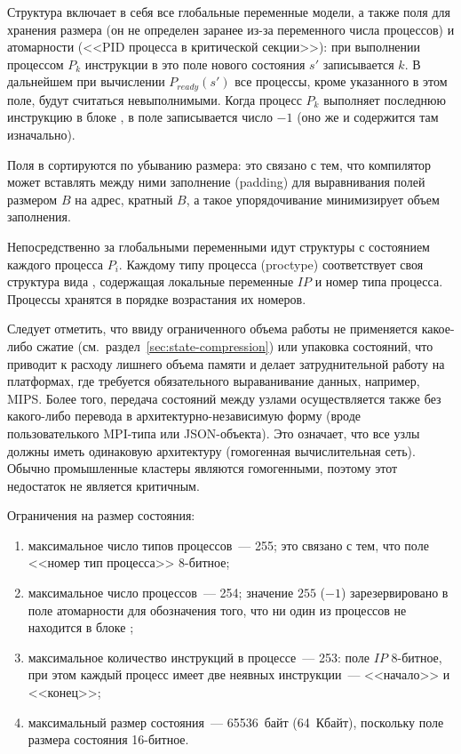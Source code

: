 Структура  включает в себя все глобальные переменные модели, а также поля для
хранения размера (он не определен заранее из-за переменного числа процессов) и атомарности
(<<PID процесса в критической секции>>): при выполнении процессом $P_k$ инструкции
 в это поле нового состояния $s'$ записывается $k$. В дальнейшем при
вычислении $P_{ready}(s')$ все процессы, кроме указанного в этом поле, будут считаться
невыполнимыми. Когда процесс $P_k$ выполняет последнюю инструкцию в блоке , в
поле записывается число $-1$ (оно же и содержится там изначально).

Поля в  сортируются по убыванию размера: это связано с тем, что компилятор
может вставлять между ними заполнение (padding) для выравнивания полей размером $B$ на
адрес, кратный $B$, а такое упорядочивание минимизирует объем заполнения.

Непосредственно за глобальными переменными идут структуры с состоянием каждого процесса
$P_i$. Каждому типу процесса (proctype) соответствует своя структура вида
, содержащая локальные переменные $IP$ и номер типа процесса. Процессы
хранятся в порядке возрастания их номеров.

Следует отметить, что ввиду ограниченного объема работы не применяется какое-либо сжатие
(см.~раздел~\ref{sec:state-compression}) или упаковка состояний, что приводит к расходу
лишнего объема памяти и делает затруднительной работу на платформах, где требуется
обязательного выраванивание данных, например, MIPS. Более того, передача состояний между
узлами осуществляется также без какого-либо перевода в архитектурно-независимую форму
(вроде пользователького MPI-типа или JSON-объекта). Это означает, что все узлы должны
иметь одинаковую архитектуру (гомогенная вычислительная сеть). Обычно промышленные
кластеры являются гомогенными, поэтому этот недостаток не является критичным.

Ограничения на размер состояния:
\begin{enumerate}
\item максимальное число типов процессов~--- 255; это связано с тем, что поле <<номер тип
  процесса>> 8-битное;
\item максимальное число процессов~--- 254; значение $255$ ($-1$) зарезервировано в поле
  атомарности для обозначения того, что ни один из процессов не находится в блоке
  ;
\item максимальное количество инструкций в процессе~--- 253: поле $IP$ 8-битное, при этом
  каждый процесс имеет две неявных инструкции~--- <<начало>> и <<конец>>;
\item максимальный размер состояния~--- 65536~байт (64~Кбайт), поскольку поле размера
  состояния 16-битное.
\end{enumerate}

